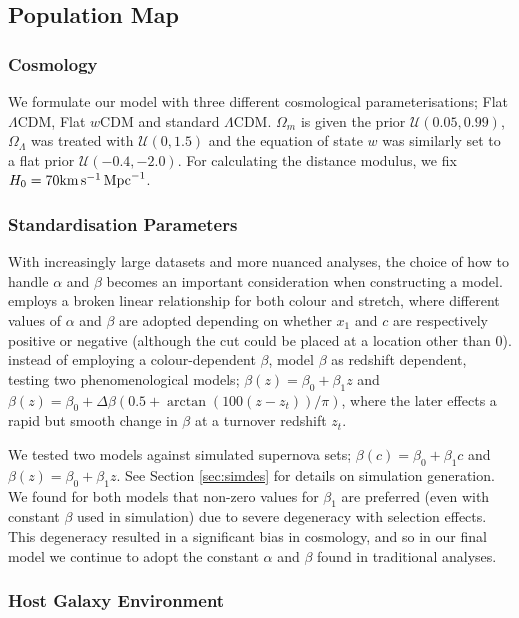 \documentclass[a4paper,fleqn,usenatbib]{mnras}
\newcommand{\kmsmpc}{{\rm km}\,{\rm s}^{-1}\,{\rm Mpc}^{-1}}
\newcommand{\rubin}{\citetalias{Rubin2015}}
\begin{document}
\subsection{Population Map}

\subsubsection{Cosmology}

We formulate our model with three different cosmological parameterisations; Flat $\Lambda$CDM, Flat $w$CDM and standard $\Lambda$CDM. $\Omega_m$ is given the prior $\mathcal{U}(0.05, 0.99)$, $\Omega_\Lambda$ was treated with $\mathcal{U}(0, 1.5)$ and the equation of state $w$ was similarly set to a flat prior $\mathcal{U}(-0.4, -2.0)$. For calculating the distance modulus, we fix $H_0 = 70 \kmsmpc $. 

\subsubsection{Standardisation Parameters}

With increasingly large datasets and more nuanced analyses, the choice of how to handle $\alpha$ and $\beta$ becomes an important consideration when constructing a model. {\rubin} employs a broken linear relationship for both colour and stretch, where different values of $\alpha$ and $\beta$ are adopted depending on whether $x_1$ and $c$ are respectively positive or negative (although the cut could be placed at a location other than 0). \citet{Shariff2016} instead of employing a colour-dependent $\beta$, model $\beta$ as redshift dependent, testing two phenomenological models; $\beta(z) = \beta_0 + \beta_1 z$ and $\beta(z) = \beta_0 + \Delta \beta\left(0.5 + \arctan(100(z - z_t)) / \pi\right)$, where the later effects a rapid but smooth change in $\beta$ at a turnover redshift $z_t$.

We tested two models against simulated supernova sets; $\beta(c) = \beta_0 + \beta_1 c$ and $\beta(z) = \beta_0 + \beta_1 z$. See Section \ref{sec:simdes} for details on simulation generation. We found for both models that non-zero values for $\beta_1$ are preferred (even with constant $\beta$ used in simulation) due to severe degeneracy with selection effects. This degeneracy resulted in a significant bias in cosmology, and so in our final model we continue to adopt the constant $\alpha$ and $\beta$ found in traditional analyses.

\subsubsection{Host Galaxy Environment}
\end{document}
